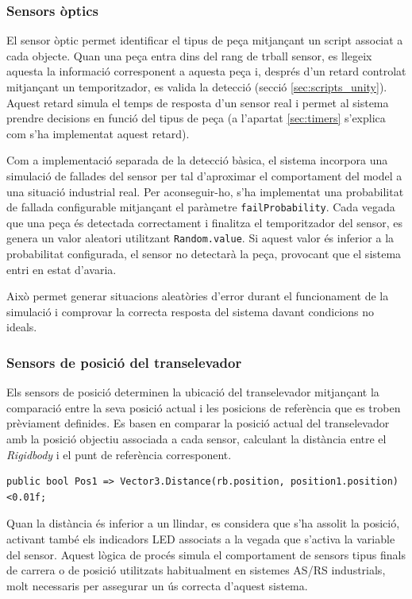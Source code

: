 \documentclass[a4paper,11pt,DIV=13,headings=normal,abstract=true,twoside=semi]{article}
\newcommand{\acro}[1]{\textsc{#1}}
\begin{document}
\subsubsection{Sensors òptics}

El sensor òptic permet identificar el tipus de peça mitjançant un script associat a cada objecte.  Quan una peça entra dins del rang de trball sensor, es llegeix aquesta la informació corresponent a aquesta peça i, després d'un retard controlat mitjançant un temporitzador, es valida la detecció (secció \ref{sec:scripts_unity}).  Aquest retard simula el temps de resposta d'un sensor real i permet al sistema prendre decisions en funció del tipus de peça (a l'apartat \ref{sec:timers} s'explica com s'ha implementat aquest retard). 

Com a implementació separada de la detecció bàsica, el sistema incorpora una simulació de fallades del sensor per tal d'aproximar el comportament del model a una situació industrial real. Per aconseguir-ho, s'ha implementat una probabilitat de fallada configurable mitjançant el paràmetre \texttt{failProbability}. Cada vegada que una peça és detectada correctament i finalitza el temporitzador del sensor, es genera un valor aleatori utilitzant \texttt{Random.value}. Si aquest valor és inferior a la probabilitat configurada, el sensor no detectarà la peça, provocant que el sistema entri en estat d'avaria.

Això permet generar situacions aleatòries d'error durant el funcionament de la simulació i comprovar la correcta resposta del sistema davant condicions no ideals.


\subsubsection{Sensors de posició del transelevador}

Els sensors de posició determinen la ubicació del transelevador mitjançant la comparació entre la seva posició actual i les posicions de referència que es troben prèviament definides. Es basen en comparar la posició actual del transelevador amb la posició objectiu associada a cada sensor, calculant la distància entre el \emph{Rigidbody} i el punt de referència corresponent.

\begin{lstlisting}[style=simple]
public bool Pos1 => Vector3.Distance(rb.position, position1.position) <0.01f;
\end{lstlisting}

Quan la distància és inferior a un llindar, es considera que s'ha assolit la posició, activant també els indicadors LED associats a la vegada que s'activa la variable del sensor. Aquest lògica de procés simula el comportament de sensors tipus finals de carrera o de posició utilitzats habitualment en sistemes \acro{AS/RS} industrials, molt necessaris per assegurar un ús correcta d'aquest sistema.
\end{document}
